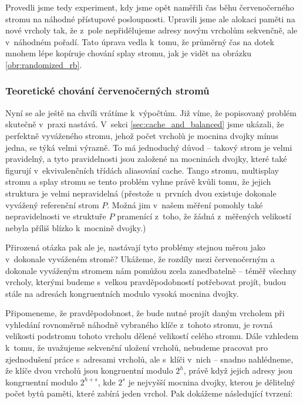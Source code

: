Provedli jsme tedy experiment, kdy jsme opět naměřili čas běhu červenočerného stromu na náhodné přístupové posloupnosti. Upravili jsme ale alokaci paměti na nové vrcholy tak, že z~pole nepřidělujeme adresy novým vrcholům sekvenčně, ale v~náhodném pořadí. Tato úprava vedla k~tomu, že průměrný čas na dotek mnohem lépe kopíruje chování splay stromu, jak je vidět na obrázku \ref{obr:randomized_rb}.


\subsubsection{Teoretické chování červenočerných stromů}

Nyní se ale ještě na chvíli vrátíme k~výpočtům. Již víme, že popisovaný problém
skutečně v~praxi nastává. V~sekci \ref{sec:cache_and_balanced} jsme ukázali, že
perfektně vyváženého stromu, jehož počet vrcholů je mocnina dvojky mínus jedna,
se týká velmi výrazně. To má jednoduchý důvod -- takový strom je velmi
pravidelný, a tyto pravidelnosti jsou založené na mocninách dvojky, které také
figurují v~ekvivalenčních třídách aliasování cache. Tango stromu, multisplay
stromu a splay stromu se tento problém vyhne právě kvůli tomu, že jejich
struktura je velmi nepravidelná (přestože u~prvních dvou existuje dokonale
vyvážený referenční strom $P$. Možná jim v~našem měření pomohly také
nepravidelnosti ve struktuře $P$ pramenící z~toho, že žádná z~měřených
velikostí nebyla příliš blízko k~mocnině dvojky.)

Přirozená otázka pak ale je, nastávají tyto problémy stejnou měrou jako
v~dokonale vyváženém stromě? Ukážeme, že rozdíly mezi červenočerným a dokonale
vyváženým stromem nám pomůžou zcela zanedbatelně -- téměř všechny vrcholy,
kterými budeme s~velkou pravděpodobností potřebovat projít, budou stále na
adresách kongruentních modulo vysoká mocnina dvojky. 

Připomeneme, že
pravděpodobnost, že bude nutné projít daným vrcholem při vyhledání rovnoměrně náhodně vybraného klíče z~tohoto stromu, je rovná velikosti
podstromu tohoto vrcholu dělené velikostí celého stromu. Dále vzhledem k~tomu,
že uvažujeme sekvenční uložení vrcholů, nebudeme pracovat pro zjednodušení
práce s~adresami vrcholů, ale s~klíči v~nich -- snadno nahlédneme, že klíče
dvou vrcholů jsou kongruentní modulo $2^h$, právě když jejich adresy jsou
kongruentní modulo $2^{h+s}$, kde $2^s$ je nejvyšší mocnina dvojky, kterou je
dělitelný počet bytů paměti, které zabírá jeden vrchol. Pak dokážeme
následující tvrzení:

